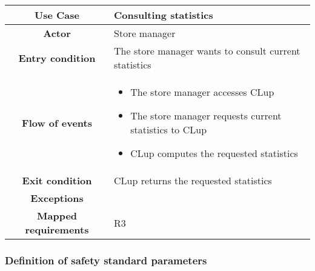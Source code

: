 \documentclass[../../main.tex]{subfiles}
\begin{document}
      \begin{table}[H]
        \centering
          \begin{tabular}{c m{}}
          \hline
          \textbf{Use Case} & Consulting statistics\\ \hline
          \textbf{Actor} & Store manager\\ \hline
          \textbf{Entry condition} & The store manager wants to consult current statistics\\  \hline
          \textbf{Flow of events} & \begin{itemize}
                                      \item The store manager accesses CLup
                                      \item The store manager requests current statistics to CLup
                                      \item CLup computes the requested statistics
                                    \end{itemize}\\ \hline
          \textbf{Exit condition} & CLup returns the requested statistics \\ \hline
          \textbf{Exceptions} & \\ \hline
          \textbf{Mapped requirements} & R3\\ \hline
          \end{tabular}
      \end{table}


      \subsubsection{Definition of safety standard parameters}
\end{document}
